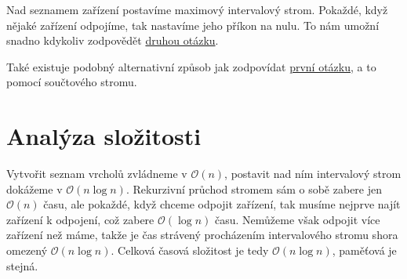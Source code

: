 \documentclass{article}
\begin{document}
Nad seznamem zařízení postavíme maximový intervalový strom. Pokaždé, když nějaké zařízení odpojíme, tak nastavíme jeho příkon na nulu. To nám umožní snadno kdykoliv zodpovědět \hyperref[question:max]{druhou otázku}.

Také existuje podobný alternativní způsob jak zodpovídat \hyperref[question:load]{první otázku}, a to pomocí součtového stromu.

\section{Analýza složitosti}

Vytvořit seznam vrcholů zvládneme v $\mathcal{O}(n)$, postavit nad ním intervalový strom dokážeme v $\mathcal{O}(n \log n)$. Rekurzivní průchod stromem sám o sobě zabere jen $\mathcal{O}(n)$ času, ale pokaždé, když chceme odpojit zařízení, tak musíme nejprve najít zařízení k odpojení, což zabere $\mathcal{O}(\log n)$ času. Nemůžeme však odpojit více zařízení než máme, takže je čas strávený procházením intervalového stromu shora omezený $\mathcal{O}(n \log n)$. Celková časová složitost je tedy $\mathcal{O}(n \log n)$, paměťová je stejná.
\end{document}

